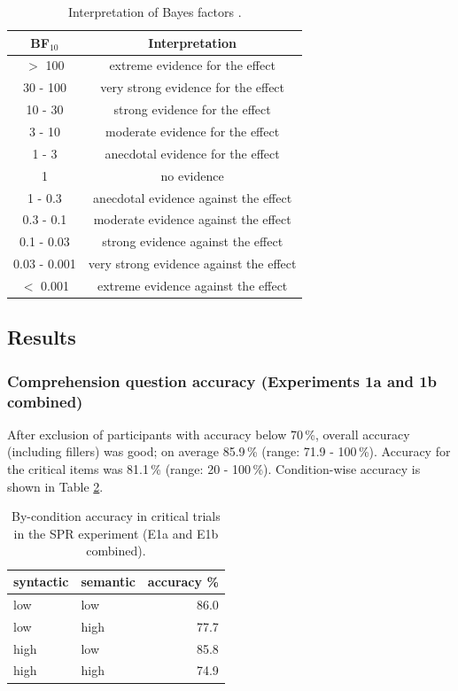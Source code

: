 \documentclass[review,preprint,12pt,authoryear,floatsintext]{elsarticle}
\begin{document}
\begin{table}[ht]
    \centering
    \caption{Interpretation of Bayes factors \citep{lee2014bayesian}.}
    \label{tab:bf_interpretation}
    \begin{tabular}{cc}
    \toprule
    BF$_{10}$ & Interpretation \\
    \midrule
$>$ 100 & extreme evidence for the effect\\
30 - 100 & very strong evidence for the effect\\
10 - 30 & strong evidence for the effect\\
3 - 10 & moderate evidence for the effect\\
1 - 3 &	anecdotal evidence for the effect\\
1  &	no evidence\\
1 - 0.3 & anecdotal evidence against the effect\\
0.3 - 0.1 & moderate evidence against the effect\\
0.1 - 0.03 & strong evidence against the effect\\
0.03 - 0.001 & very strong evidence against the effect\\
$<$ 0.001 & extreme evidence against the effect\\
\bottomrule
    \end{tabular}
\end{table}


\subsection*{Results}
\subsubsection*{Comprehension question accuracy (Experiments 1a and 1b combined)}

After exclusion of participants with accuracy below 70\,\%, overall accuracy (including fillers) was good; on average 85.9\,\% (range: 71.9 - 100\,\%). Accuracy for the critical items was 81.1\,\% (range: 20 - 100\,\%). Condition-wise accuracy is shown in Table \ref{tab:spr_acc}.

\begin{table}[ht]
    \caption{By-condition accuracy in critical trials in the SPR experiment (E1a and E1b combined).}
    \label{tab:spr_acc}
    \centering
    \begin{tabular}{llr}
    \toprule
    syntactic & semantic & accuracy \%\\
    \midrule
        low &  low & 86.0\\
        low &  high & 77.7\\
        high &  low & 85.8\\
        high &  high & 74.9\\
    \bottomrule
    \end{tabular}
\end{table}
\end{document}
